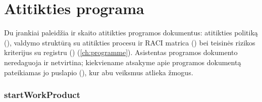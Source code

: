 \section{Atitikties programa}\label{sec:tools:programme}

Du įrankiai paleidžia ir skaito atitikties programos dokumentus: atitikties politiką
(), valdymo struktūrą su atitikties procesu ir RACI matrica () bei
teisinės rizikos kriterijus su registru () (\cref{ch:programme}). Asistentas
programos dokumento neredaguoja ir netvirtina; kiekviename atsakyme apie programos dokumentą
pateikiamas jo puslapio  (), kur abu veiksmus atlieka žmogus.

\subsubsection{startWorkProduct}\label{sec:tools:startWorkProduct}
